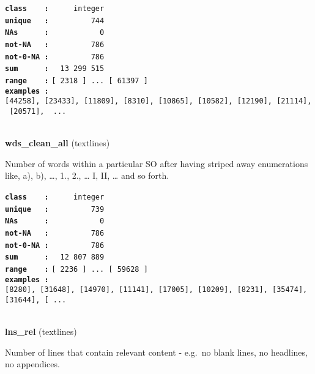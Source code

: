 \documentclass[]{article}
\begin{document}
\textbf{\texttt{class\ \ \ \ :}} \texttt{~~~~~integer}\\
\textbf{\texttt{unique\ \ \ :}} \texttt{~~~~~~~~~744}\\
\textbf{\texttt{NAs\ \ \ \ \ \ :}} \texttt{~~~~~~~~~~~0}\\
\textbf{\texttt{not-NA\ \ \ :}} \texttt{~~~~~~~~~786}\\
\textbf{\texttt{not-0-NA\ :}} \texttt{~~~~~~~~~786}\\
\textbf{\texttt{sum\ \ \ \ \ \ :}} \texttt{~~13~299~515}\\
\textbf{\texttt{range\ \ \ \ :}}
\texttt{{[}\ 2318\ {]}\ ...\ {[}\ 61397\ {]}}\\
\textbf{\texttt{examples\ :}}
\texttt{{[}44258{]},\ {[}23433{]},\ {[}11809{]},\ {[}8310{]},\ {[}10865{]},\ {[}10582{]},\ {[}12190{]},\ {[}21114{]},\ {[}20571{]},\ \ ...}\\

~

\textbf{wds\_clean\_all} (textlines)

Number of words within a particular SO after having striped away
enumerations like, a), b), \ldots{}, 1., 2., \ldots{} I, II, \ldots{}
and so forth.

\textbf{\texttt{class\ \ \ \ :}} \texttt{~~~~~integer}\\
\textbf{\texttt{unique\ \ \ :}} \texttt{~~~~~~~~~739}\\
\textbf{\texttt{NAs\ \ \ \ \ \ :}} \texttt{~~~~~~~~~~~0}\\
\textbf{\texttt{not-NA\ \ \ :}} \texttt{~~~~~~~~~786}\\
\textbf{\texttt{not-0-NA\ :}} \texttt{~~~~~~~~~786}\\
\textbf{\texttt{sum\ \ \ \ \ \ :}} \texttt{~~12~807~889}\\
\textbf{\texttt{range\ \ \ \ :}}
\texttt{{[}\ 2236\ {]}\ ...\ {[}\ 59628\ {]}}\\
\textbf{\texttt{examples\ :}}
\texttt{{[}8280{]},\ {[}31648{]},\ {[}14970{]},\ {[}11141{]},\ {[}17005{]},\ {[}10209{]},\ {[}8231{]},\ {[}35474{]},\ {[}31644{]},\ {[}\ ...}\\

~

\textbf{lns\_rel} (textlines)

Number of lines that contain relevant content - e.g.~no blank lines, no
headlines, no appendices.
\end{document}

